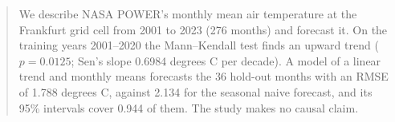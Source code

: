 \begin{abstract}
We describe NASA POWER's monthly mean air temperature at the Frankfurt grid cell from 2001 to 2023 (276 months) and forecast it. On the training years 2001--2020 the Mann--Kendall test finds an upward trend ($p = 0.0125$; Sen's slope 0.6984 degrees C per decade). A model of a linear trend and monthly means forecasts the 36 hold-out months with an RMSE of 1.788 degrees C, against 2.134 for the seasonal naive forecast, and its 95\% intervals cover 0.944 of them. The study makes no causal claim.
\end{abstract}
